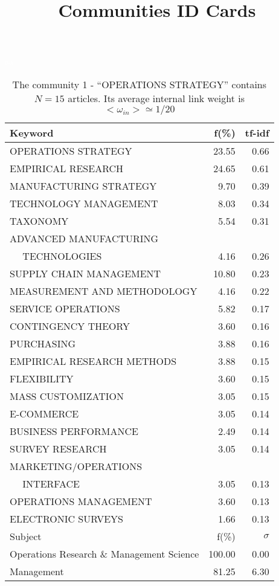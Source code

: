 \documentclass[a4paper,11pt]{report}
\title{{\bf Communities ID Cards}}
\date{\begin{flushleft}This document gather the ``ID Cards'' of the CC communities found within your database.\\
 The CC network was built by keeping a link between articles sharing at least 5 references. The communities characterized here correspond to the ones found in the level 1 (in the sense of the Louvain algo) which gathers more than 0 articles.\\
 These ID cards displays the most frequent keywords, subject categories, journals of publication, institution, countries, authors, references and reference journals of the articles of each community. The significance of an item $\sigma = \sqrt{N} (f - p) / \sqrt{p(1-p)}$ [where $N$ is the number of articles within the community and $f$ and $p$ are the proportion of articles respectively within the community and within the database displaying that item ] is also given (for example $\sigma > 5$ is really highly significant). The tf-idf value which can be calculated by $tf-idf = f*log(frac{1}{p})$ is also given.\\
\vspace{1cm}
\copyright Sebastian Grauwin, Liu Weizhi - (2014) \end{flushleft}}
\begin{document}
\begin{landscape}
\maketitle
\clearpage

\begin{table}[!ht]
\caption{The community 1 - ``OPERATIONS STRATEGY'' contains $N = 15$ articles. Its average internal link weight is $<\omega_{in}> \simeq 1/20$ }
\textcolor{white}{aa}\\
{\scriptsize\begin{tabular}{|l r  r|}
\hline
Keyword & f(\%) & tf-idf \\
\hline
OPERATIONS STRATEGY & 23.55 & 0.66\\
EMPIRICAL RESEARCH & 24.65 & 0.61\\
MANUFACTURING STRATEGY & 9.70 & 0.39\\
TECHNOLOGY MANAGEMENT & 8.03 & 0.34\\
TAXONOMY & 5.54 & 0.31\\
ADVANCED MANUFACTURING &  &\\
$\quad$ TECHNOLOGIES & 4.16 & 0.26\\
SUPPLY CHAIN MANAGEMENT & 10.80 & 0.23\\
MEASUREMENT AND METHODOLOGY & 4.16 & 0.22\\
SERVICE OPERATIONS & 5.82 & 0.17\\
CONTINGENCY THEORY & 3.60 & 0.16\\
PURCHASING & 3.88 & 0.16\\
EMPIRICAL RESEARCH METHODS & 3.88 & 0.15\\
FLEXIBILITY & 3.60 & 0.15\\
MASS CUSTOMIZATION & 3.05 & 0.15\\
E-COMMERCE & 3.05 & 0.14\\
BUSINESS PERFORMANCE & 2.49 & 0.14\\
SURVEY RESEARCH & 3.05 & 0.14\\
MARKETING/OPERATIONS &  &\\
$\quad$ INTERFACE & 3.05 & 0.13\\
OPERATIONS MANAGEMENT & 3.60 & 0.13\\
ELECTRONIC SURVEYS & 1.66 & 0.13\\
\hline
\hline
Subject & f(\%) & $\sigma$\\
\hline
Operations Research \& Management Science & 100.00 & 0.00\\
Management & 81.25 & 6.30\\

\end{tabular}}
\end{table}
\end{landscape}
\end{document}
